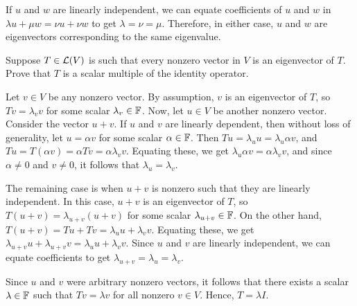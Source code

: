 \begin{exc}
\begin{solution}
If $u$ and $w$ are linearly independent, we can equate coefficients of $u$ and
$w$ in $\lambda u+\mu w=\nu u+\nu w$ to get $\lambda=\nu=\mu$. Therefore, in
either case, $u$ and $w$ are eigenvectors corresponding to the same
eigenvalue.
\end{solution}

\begin{exercise}
Suppose $T\in\mathcal{L}(V)$ is such that every nonzero vector in $V$ is an
eigenvector of $T$. Prove that $T$ is a scalar multiple of the identity
operator.
\end{exercise}
\begin{solution}
Let $v\in V$ be any nonzero vector. By assumption, $v$ is an eigenvector of
$T$, so $Tv=\lambda_vv$ for some scalar $\lambda_v\in\mathbb{F}$. Now, let $u\in V$ be
another nonzero vector. Consider the vector $u+v$. If $u$ and $v$ are linearly
dependent, then without loss of generality, let $u=\alpha v$ for some scalar
$\alpha\in\mathbb{F}$. Then $Tu=\lambda_uu=\lambda_u\alpha v$, and
$Tu=T(\alpha v)=\alpha Tv=\alpha\lambda_vv$. Equating these, we get
$\lambda_u\alpha v=\alpha\lambda_vv$, and since $\alpha\ne0$ and $v\ne0$, it
follows that $\lambda_u=\lambda_v$.

The remaining case is when $u+v$ is nonzero such that they are linearly
independent. In this case, $u+v$ is an eigenvector of $T$, so
$T(u+v)=\lambda_{u+v}(u+v)$ for some scalar $\lambda_{u+v}\in\mathbb{F}$. On the other
hand, $T(u+v)=Tu+Tv=\lambda_uu+\lambda_vv$. Equating these, we get
$\lambda_{u+v}u+\lambda_{u+v}v=\lambda_uu+\lambda_vv$. Since $u$ and $v$ are
linearly independent, we can equate coefficients to get
$\lambda_{u+v}=\lambda_u=\lambda_v$.

Since $u$ and $v$ were arbitrary nonzero vectors, it follows that there exists
a scalar $\lambda\in\mathbb{F}$ such that $Tv=\lambda v$ for all nonzero $v\in V$.
Hence, $T=\lambda I$.
\end{solution}


\end{exc}
